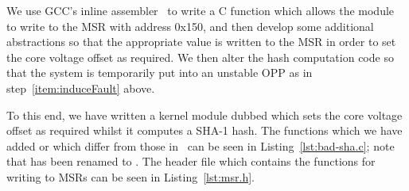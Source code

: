 We use GCC's inline assembler~\cite{guyverCode} to write a C function which
allows the module to write to the MSR with address 0x150, and then develop some
additional abstractions so that the appropriate value is written to the MSR in
order to set the core voltage offset as required. We then
alter the hash computation code so that the system is temporarily put into an
unstable OPP as in step~\ref{item:induceFault} above.

To this end, we have written a kernel module dubbed  which sets
the core voltage offset as required whilst it computes a SHA-1 hash. The 
functions which we have added or which differ from those in~\cite{gnupgSHA}
can be seen in Listing~\ref{lst:bad-sha.c}; note that  has been
renamed to . The header file  which contains
the functions for writing to MSRs can be seen in Listing~\ref{lst:msr.h}.
